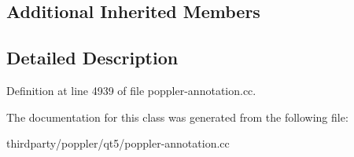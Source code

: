 \subsection*{Additional Inherited Members}


\subsection{Detailed Description}


Definition at line 4939 of file poppler-\/annotation.\+cc.



The documentation for this class was generated from the following file\+:\begin{DoxyCompactItemize}
\item 
thirdparty/poppler/qt5/poppler-\/annotation.\+cc\end{DoxyCompactItemize}
